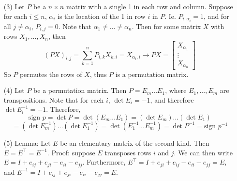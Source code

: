 \begin{itemize}
\item[(3)]
Let $P$ be a $n \times n$ matrix with a single 1 in each row and column. Suppose for each $i \leq n$, $\alpha_i$ is the location of the 1 in row $i$ in $P$. Ie. $P_{i, \alpha_i} = 1$, and for all $j \neq \alpha_i$, $P_{i, j} = 0$. Note that $\alpha_1 \neq ... \neq \alpha_n$. Then for some matrix $X$ with rows $X_1, ..., X_n$, then
$$(PX)_{i,j} = \sum_{k=1}^n P_{i,k}X_{k,i} = X_{\alpha_i, i} \rightarrow PX = \begin{bmatrix}
X_{\alpha_1} \\
\vdots \\
X_{\alpha_n}
\end{bmatrix}$$
So $P$ permutes the rows of $X$, thus $P$ is a permutation matrix.
\item[(4)]
Let $P$ be a permutation matrix. Then $P = E_m...E_1$, where $E_1, ..., E_m$ are transpositions. Note that for each $i$, $\det E_i = -1$, and therefore $\det E_i^{-1} = -1$. Therefore,
$$\text{sign }p = \det P = \det (E_m...E_1) = (\det E_m)...(\det E_1)$$
$$= (\det E_m^{-1})...(\det E_1^{-1}) = \det(E_1^{-1}...E_m^{-1}) = \det P^{-1} = \text{sign }p^{-1}$$
\item[(5)]
Lemma: Let $E$ be an elementary matrix of the second kind. Then $E = E^\top = E^{-1}$. Proof: suppose $E$ transposes rows $i$ and $j$. We can then write $E = I + e_{ij} + e_{ji} - e_{ii} - e_{jj}$. Furthermore, $E^\top = I + e_{ji} + e_{ij} - e_{ii} - e_{jj} = E$, and $E^{-1} = I + e_{ij} + e_{ji} - e_{ii} - e_{jj} = E$.


\end{itemize}
